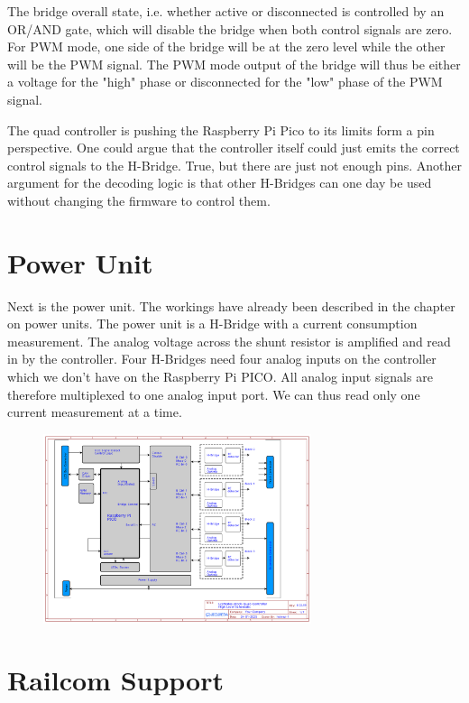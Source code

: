 The bridge overall state, i.e. whether active or disconnected is controlled by an OR/AND gate, which will disable the bridge when both control signals are zero. For PWM mode, one side of the bridge will be at the zero level while the other will be the PWM signal. The PWM mode output of the bridge will thus be either a voltage for the "high" phase or disconnected for the "low" phase of the PWM signal.

The quad controller is pushing the Raspberry Pi Pico to its limits form a pin perspective. One could argue that the controller itself could just emits the correct control signals to the H-Bridge. True, but there are just not enough pins. Another argument for the decoding logic is that other H-Bridges can one day be used without changing the firmware to control them. 

\section{Power Unit}

Next is the power unit. The workings have already been described in the chapter on power units. The power unit is a H-Bridge with a current consumption measurement. The analog voltage across the shunt resistor is amplified and read in by the controller. Four H-Bridges need four analog inputs on the controller which we don't have on the Raspberry Pi PICO. All analog input signals are therefore multiplexed to one analog input port. We can thus read only one current measurement at a time.

\begin{figure}[htbp]
    \centering
    \includegraphics[page=4, width=0.7\textwidth]{./Schematics/Schematic_LcsNodes-Block-Quad-Controller.pdf}
\end{figure}
\FloatBarrier

\section{Railcom Support}

